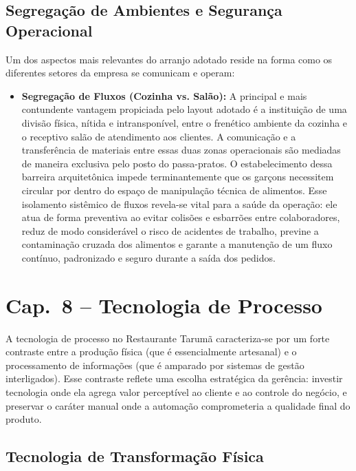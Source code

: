 \documentclass[12pt, a4paper]{article}
\begin{document}
\subsection{Segregação de Ambientes e Segurança Operacional}
Um dos aspectos mais relevantes do arranjo adotado reside na forma como os diferentes setores da empresa se comunicam e operam:

\begin{itemize}
    \item \textbf{Segregação de Fluxos (Cozinha vs. Salão):} A principal e mais contundente vantagem propiciada pelo layout adotado é a instituição de uma divisão física, nítida e intransponível, entre o frenético ambiente da cozinha e o receptivo salão de atendimento aos clientes. A comunicação e a transferência de materiais entre essas duas zonas operacionais são mediadas de maneira exclusiva pelo posto do passa-pratos. O estabelecimento dessa barreira arquitetônica impede terminantemente que os garçons necessitem circular por dentro do espaço de manipulação técnica de alimentos. Esse isolamento sistêmico de fluxos revela-se vital para a saúde da operação: ele atua de forma preventiva ao evitar colisões e esbarrões entre colaboradores, reduz de modo considerável o risco de acidentes de trabalho, previne a contaminação cruzada dos alimentos e garante a manutenção de um fluxo contínuo, padronizado e seguro durante a saída dos pedidos.
\end{itemize}

\section{Cap.~8 – Tecnologia de Processo}

A tecnologia de processo no Restaurante Tarumã caracteriza-se por um forte contraste entre a produção física (que é essencialmente artesanal) e o processamento de informações (que é amparado por sistemas de gestão interligados). Esse contraste reflete uma escolha estratégica da gerência: investir tecnologia onde ela agrega valor perceptível ao cliente e ao controle do negócio, e preservar o caráter manual onde a automação comprometeria a qualidade final do produto.

\subsection{Tecnologia de Transformação Física}
\end{document}
